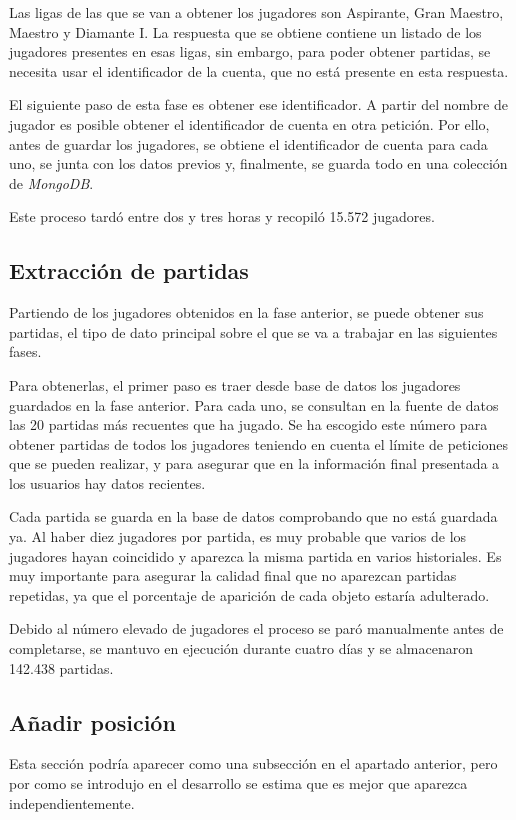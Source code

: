 Las ligas de las que se van a obtener los jugadores son Aspirante, Gran Maestro, Maestro y Diamante I. La respuesta que se obtiene contiene un listado de los jugadores presentes en esas ligas, sin embargo, para poder obtener partidas, se necesita usar el identificador de la cuenta, que no está presente en esta respuesta.

El siguiente paso de esta fase es obtener ese identificador. A partir del nombre de jugador es posible obtener el identificador de cuenta en otra petición. Por ello, antes de guardar los jugadores, se obtiene el identificador de cuenta para cada uno, se junta con los datos previos y, finalmente, se guarda todo en una colección de \textit{MongoDB}.

Este proceso tardó entre dos y tres horas y recopiló 15.572 jugadores.

\subsection{Extracción de partidas}
Partiendo de los jugadores obtenidos en la fase anterior, se puede obtener sus partidas, el tipo de dato principal sobre el que se va a trabajar en las siguientes fases.

Para obtenerlas, el primer paso es traer desde base de datos los jugadores guardados en la fase anterior. Para cada uno, se consultan en la fuente de datos las 20 partidas más recuentes que ha jugado. Se ha escogido este número para obtener partidas de todos los jugadores teniendo en cuenta el límite de peticiones que se pueden realizar, y para asegurar que en la información final presentada a los usuarios hay datos recientes.

Cada partida se guarda en la base de datos comprobando que no está guardada ya. Al haber diez jugadores por partida, es muy probable que varios de los jugadores hayan coincidido y aparezca la misma partida en varios historiales. Es muy importante para asegurar la calidad final que no aparezcan partidas repetidas, ya que el porcentaje de aparición de cada objeto estaría adulterado.

Debido al número elevado de jugadores el proceso se paró manualmente antes de completarse, se mantuvo en ejecución durante cuatro días y se almacenaron 142.438 partidas.

\subsection{Añadir posición}
Esta sección podría aparecer como una subsección en el apartado anterior, pero por como se introdujo en el desarrollo se estima que es mejor que aparezca independientemente.

